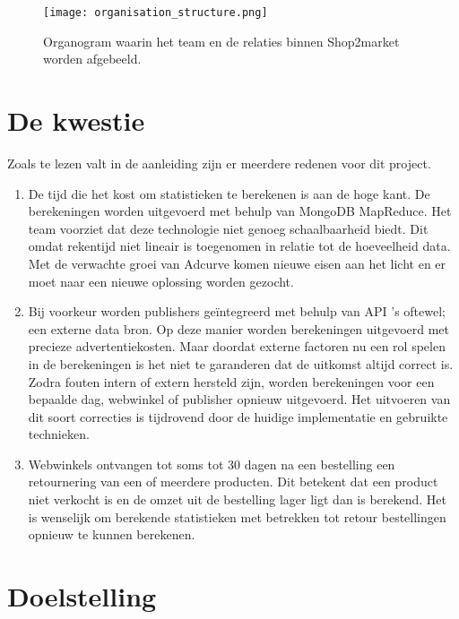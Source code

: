 \begin{figure}[h]
    \texttt{[image: organisation\_structure.png]}
    \caption{Organogram waarin het team en de relaties binnen Shop2market worden afgebeeld.}
    \label{fig:orgchart}
\end{figure}


\clearpage

\section{De kwestie} %

Zoals te lezen valt in de aanleiding zijn er meerdere redenen voor dit project.

\begin{enumerate}
    \item De tijd die het kost om statistieken te berekenen is aan de hoge kant. De berekeningen worden uitgevoerd met behulp van MongoDB MapReduce. Het team voorziet dat deze technologie niet genoeg schaalbaarheid biedt. Dit omdat rekentijd niet lineair is toegenomen in relatie tot de hoeveelheid data. Met de verwachte groei van Adcurve komen nieuwe eisen aan het licht en er moet naar een nieuwe oplossing worden gezocht.
    \item Bij voorkeur worden publishers geïntegreerd met behulp van API 's oftewel; een externe data bron. Op deze manier worden berekeningen uitgevoerd met precieze advertentiekosten. Maar doordat externe factoren nu een rol spelen in de berekeningen is het niet te garanderen dat de uitkomst altijd correct is. Zodra fouten intern of extern hersteld zijn, worden berekeningen voor een bepaalde dag, webwinkel of publisher opnieuw uitgevoerd. Het uitvoeren van dit soort correcties is tijdrovend door de huidige implementatie en gebruikte technieken.
    \item Webwinkels ontvangen tot soms tot 30 dagen na een bestelling een retournering van een of meerdere producten. Dit betekent dat een product niet verkocht is en de omzet uit de bestelling lager ligt dan is berekend. Het is wenselijk om berekende statistieken met betrekken tot retour bestellingen opnieuw te kunnen berekenen.
\end{enumerate}

\section{Doelstelling} %
\label{sec:doelstelling}

